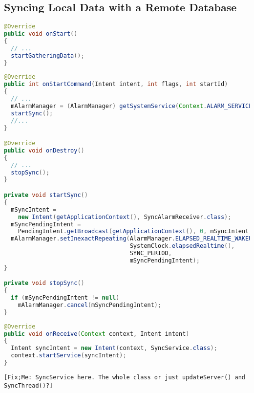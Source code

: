 \documentclass[11pt, a4paper, oneside, english]{scrbook}
\begin{document}
\subsection{Syncing Local Data with a Remote Database} %
\label{sub:syncing_local_data_with_a_remote_database}
\begin{lstlisting}[language=Java, numbers=none]
@Override
public void onStart()
{
  // ...
  startGatheringData();
}
\end{lstlisting}
\begin{lstlisting}[language=Java, numbers=none]
@Override
public int onStartCommand(Intent intent, int flags, int startId)
{
  // ...
  mAlarmManager = (AlarmManager) getSystemService(Context.ALARM_SERVICE);
  startSync();
  //...
}

@Override
public void onDestroy()
{
  // ...
  stopSync();
}

private void startSync()
{
  mSyncIntent = 
    new Intent(getApplicationContext(), SyncAlarmReceiver.class);
  mSyncPendingIntent = 
    PendingIntent.getBroadcast(getApplicationContext(), 0, mSyncIntent, 0);
  mAlarmManager.setInexactRepeating(AlarmManager.ELAPSED_REALTIME_WAKEUP,
                                    SystemClock.elapsedRealtime(),
                                    SYNC_PERIOD,
                                    mSyncPendingIntent);
}

private void stopSync()
{
  if (mSyncPendingIntent != null)
    mAlarmManager.cancel(mSyncPendingIntent);
}
\end{lstlisting}
\begin{lstlisting}[language=Java, numbers=none]
@Override
public void onReceive(Context context, Intent intent)
{
  Intent syncIntent = new Intent(context, SyncService.class);
  context.startService(syncIntent);
}
\end{lstlisting}
\begin{lstlisting}
[Fix;Me: SyncService here. The whole class or just updateServer() and SyncThread()?]
\end{lstlisting}
\end{document}
